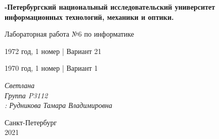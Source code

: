 \begin{center}
\thispagestyle{empty}
\textbf{-Петербургский национальный исследовательский университет информационных технологий, механики и оптики.}


\vspace{4cm}
\huge{ Лабораторная работа №6 по информатике}


\huge{1972 год, 1 номер   |   Вариант 21}


\huge{1970 год, 1 номер   |   Вариант 1}

\vspace{3cm}
\begin{flushright}
\textit{ Светлана}
\\
\textit{Группа P3112}\\
\textit{: Рудникова Тамара Владимировна }
\end{flushright}
\vspace{7cm}
Санкт-Петербург \\
2021
\end{center}